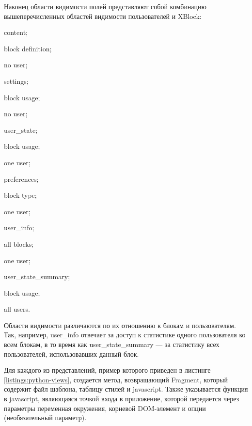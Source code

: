 Наконец области видимости полей представляют собой комбинацию вышеперечисленных областей видимости пользователей и XBlock:
\begin{itemize*}
	\item content;
	\begin{itemize*}
		\item block definition;
		\item no user;
	\end{itemize*}
	\item settings;
	\begin{itemize*}
		\item block usage;
		\item no user;
	\end{itemize*}
	\item user\_state;
	\begin{itemize*}
		\item block usage;
		\item one user;
	\end{itemize*}
	\item preferences;
	\begin{itemize*}
		\item block type;
		\item one user;
	\end{itemize*}
	\item user\_info;
	\begin{itemize*}
		\item all blocks;
		\item one user;
	\end{itemize*}
	\item user\_state\_summary;	
	\begin{itemize*}
		\item block usage;
		\item all users.
	\end{itemize*}
\end{itemize*}

Области видимости различаются по их отношению к блокам и пользователям. Так, например, user\_info отвечает за доступ к статистике одного пользователя ко всем блокам, в
то время как user\_state\_summary — за статистику всех пользователей, использовавших
данный блок.

Для каждого из представлений, пример которого приведен в листинге \ref{listings:python-views}, создается метод, возвращающий Fragment, который содержит файл шаблона, таблицу стилей и javascript. Также указывается функция в javascript, являющаяся точкой входа в приложение, которой передается через параметры переменная окружения, корневой DOM-элемент и опции (необязательный параметр).

